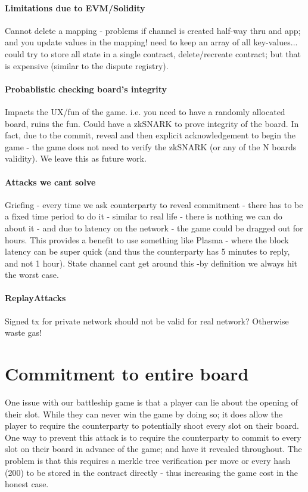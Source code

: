 \documentclass{llncs}
\begin{document}
\paragraph{Limitations due to EVM/Solidity} Cannot delete a mapping - problems if channel is created half-way thru and app; and you update values in the mapping! need to keep an array of all key-values... could try to store all state in a single contract, delete/recreate contract; but that is expensive (similar to the dispute registry).  

\paragraph{Probablistic checking board's integrity} Impacts the UX/fun of the game. i.e. you need to have a randomly allocated board, ruins the fun. Could have a zkSNARK to prove integrity of the board. In fact, due to the commit, reveal and then explicit acknowledgement to begin the game - the game does not need to verify the zkSNARK (or any of the N boards validity). We leave this as future work.  

\paragraph{Attacks we cant solve} Griefing - every time we ask counterparty to reveal commitment - there has to be a fixed time period to do it - similar to real life - there is nothing we can do about it - and due to latency on the network - the game could be dragged out for hours. This provides a benefit to use something like Plasma - where the block latency can be super quick (and thus the counterparty has 5 minutes to reply, and not 1 hour). State channel cant get around this -by definition we always hit the worst case. 


\paragraph{ReplayAttacks} Signed tx for private network should not be valid for real network? Otherwise waste gas! 
 
\appendix

\section{Commitment to entire board}

One issue with our battleship game is that a player can lie about the opening of their slot. While they can never win the game by doing so; it does allow the player to require the counterparty to potentially shoot every slot on their board. One way to prevent this attack is to require the counterparty to commit to every slot on their board in advance of the game; and have it revealed throughout. The problem is that this requires a merkle tree verification per move or every hash (200) to be stored in the contract directly - thus increasing the game cost in the honest case. 
\end{document}
